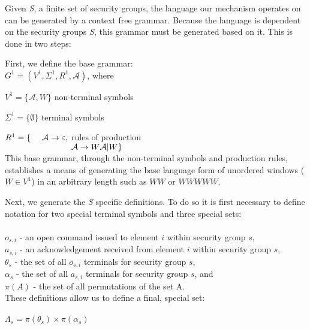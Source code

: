 \documentclass{article}
\newcommand{\tab}{\hspace*{2em}}
\begin{document}
Given \emph{S}, a finite set of security groups, the language our mechanism operates on can be generated by a context free grammar. Because the language is dependent on the security groups \emph{S}, this grammar must be generated based on it. This is done in two steps:

First, we define the base grammar:\\

\tab $G^1 = (V^1, \Sigma^1, R^1, \mathcal{A})$, where

\tab $V^1 = \{\mathcal{A} , W\}$ \hfill non-terminal symbols \hspace*{6em}

\tab $\Sigma ^1 = \{ \emptyset\}$ \hfill terminal symbols\hspace*{6.3em}

\tab $R^1 = \lbrace \hspace*{1.35em}\mathcal{A} \rightarrow \varepsilon ,$ \hfill rules of production \hspace*{6em} \\
$\tab \hspace*{5.9em} \mathcal{A}\rightarrow W\mathcal{A} |W\rbrace$\\

This base grammar, through the non-terminal symbols and production rules, establishes a means of generating the base language form of unordered windows ($W\in V^1$) in an arbitrary length such as $WW$ or $WWWWW$.

Next, we generate the \emph{S} specific definitions. To do so it is first necessary to define notation for two special terminal symbols and three special sets:\\
\\
$o_{s,i}$ - an open command issued to element $i$ within security group $s$,\\
$a_{s,i}$ - an acknowledgement received from element $i$ within security group $s$,\\
$\theta_s$ - the set of all $o_{s,i}$ terminals for security group $s$, \\
$\alpha_s$ - the set of all $a_{s,i}$ terminals for security group $s$, and \\
$\pi(A)$ - the set of all permutations of the set A.\\

These definitions allow us to define a final, special set:\\
\\
$\Lambda_s = \pi(\theta_s) \times \pi(\alpha_s)$\\
\end{document}
